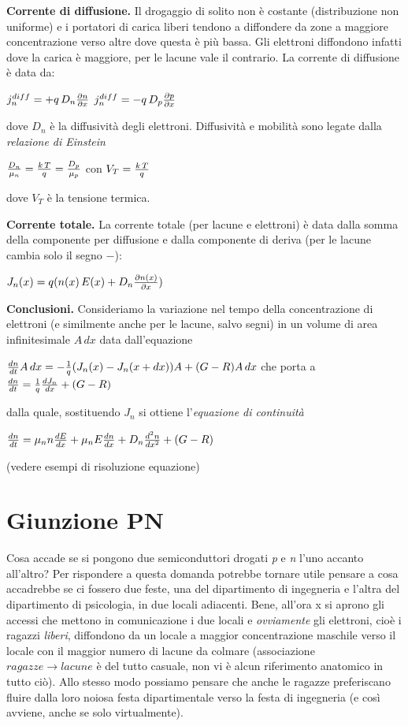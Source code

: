 \documentclass[a4paper,portrait,12pt]{article}
\theoremstyle{definition}
\begin{document}
\textbf{Corrente di diffusione.} Il drogaggio di solito non è costante (distribuzione non uniforme) e i 
portatori di carica liberi 
tendono a diffondere da zone a maggiore concentrazione verso altre dove questa è più bassa.
Gli elettroni diffondono infatti dove la carica è maggiore, per le lacune vale il contrario. La corrente 
di diffusione è data da:
\begin{center}
$j_n^{diff} = +q\,D_n{\partial n \over \partial x}$ \qquad $j_n^{diff}=-q\,D_p{\partial p\over \partial x}$
\end{center}
dove $D_n$ è la diffusività degli elettroni.
Diffusività e mobilità sono legate dalla
\textit{relazione di Einstein}
\begin{center}
${D_n \over \mu_n} = {k\,T \over q} = {D_p \over \mu_p}$ con $V_T = {k\,T \over q}$
\end{center}
dove $V_T$ è la tensione termica.
\bigskip

\textbf{Corrente totale.} La corrente totale (per lacune e elettroni) è data dalla somma della componente 
per diffusione e dalla componente di deriva (per le lacune cambia solo il segno $-$):
\begin{center}
$J_n(x) = q(n(x)\,E(x) + D_n{\partial n(x) \over \partial x})$
\end{center}

\textbf{Conclusioni.} Consideriamo la variazione nel tempo della concentrazione di elettroni (e similmente 
anche per le lacune, salvo segni) in un volume di area infinitesimale $A\,dx$ data dall'equazione
\begin{center}
${dn \over dt}A\,dx = -{1\over q}(J_n(x) - J_n(x + dx))A + (G-R)A\,dx$ che porta a
${dn \over dt} = {1\over q}{dJ_n\over dx} + (G-R)$
\end{center}
dalla quale, sostituendo $J_n$ si ottiene l'\textit{equazione di continuità}
\begin{center}
${dn \over dt} = \mu_nn{dE\over dx} + \mu_nE{dn\over dx} + D_n{d^2n\over dx^2} + (G-R)$
\end{center}

(vedere esempi di risoluzione equazione)


\section{Giunzione PN}

Cosa accade se si pongono due semiconduttori drogati \textit{p} e \textit{n} l'uno accanto all'altro? Per
rispondere a questa domanda potrebbe tornare utile pensare a cosa accadrebbe se ci fossero due feste, 
una del dipartimento di ingegneria e l'altra del dipartimento di psicologia, in due locali adiacenti. Bene,
all'ora x si aprono gli accessi che mettono in comunicazione i due locali e \textit{ovviamente} gli elettroni,
cioè i ragazzi \textit{liberi}, diffondono da un locale a maggior concentrazione maschile verso il locale
con il maggior numero di lacune da colmare (associazione $ragazze \to lacune$ è del tutto casuale, non vi è
alcun riferimento anatomico in tutto ciò). Allo stesso modo possiamo pensare che anche le ragazze preferiscano
fluire dalla loro noiosa festa dipartimentale verso la festa di ingegneria (e così avviene, anche se solo 
virtualmente).\\
 
\end{document}
